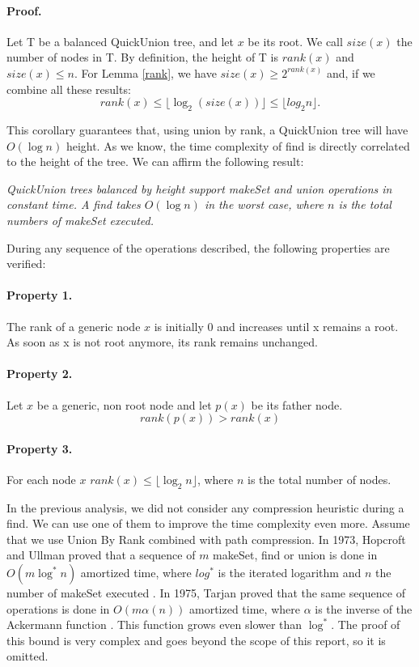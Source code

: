 \documentclass{article}
\begin{document}
\paragraph{Proof.} Let T be a balanced QuickUnion tree, and let $x$ be its root. We call $size(x)$
the number of nodes in T. By definition, the height of T is $rank(x)$ and $size(x) \leq n$. For Lemma
\ref{rank}, we have $size(x) \geq 2^{rank(x)}$ and, if we combine all these results:
$$rank(x) \leq \lfloor \log_2 (size(x))\rfloor \leq \lfloor log_2 n \rfloor.$$

\bigskip

This corollary guarantees that, using union by rank, a QuickUnion tree will have $O(\log n)$ height. As we know, the time complexity of find
is directly correlated to the height of the tree. We can affirm the following result:

\bigskip

\emph{QuickUnion trees balanced by height support makeSet and union operations in constant time. A find takes $O(\log n)$
in the worst case, where $n$ is the total numbers of makeSet executed.}

During any sequence of the operations described, the following properties are verified:
\paragraph{Property 1.} The rank of a generic node $x$ is initially 0 and increases until x remains a root. As soon as x is not root anymore, its rank
remains unchanged.
\paragraph{Property 2.} Let $x$ be a generic, non root node and let $p(x)$ be its father node.
$$rank(p(x)) > rank(x)$$ 
\paragraph{Property 3.} For each node $x$ $ rank(x) \leq \lfloor \log_2 n \rfloor$, where $n$ is the total number of nodes.

\bigskip

In the previous analysis, we did not  consider any compression heuristic during a find. We can use one of them to improve the time complexity
even more. 
Assume that we use Union By Rank combined with path compression.
In 1973, Hopcroft and Ullman proved that a sequence of $m$ makeSet, find or  union is done in $O(m\log^* n)$ amortized time, where $log^*$ is the iterated
logarithm and $n$ the number of makeSet executed \cite{hopcroft1973set}. In 1975, Tarjan proved that the same sequence of operations
is done in $O(m\alpha(n))$ amortized time, where $\alpha$ is the inverse of the Ackermann function \cite{tarjan1975efficiency}. This function grows even slower than $\log^*$.
The proof of this bound is very complex and goes beyond the scope of this report, so it is omitted.  
\end{document}
